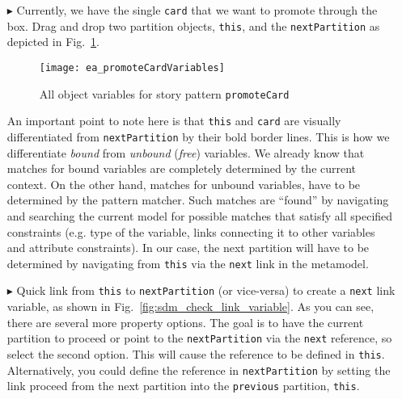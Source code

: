 \begin{itemize}
\vspace{0.5cm}

\item[$\blacktriangleright$] Currently, we have the single \texttt{card} that we want to promote through the box. Drag and drop two partition objects,
\texttt{this}, and the \texttt{nextPartition} as depicted in Fig.~\ref{fig:sdm_check_complete_sp}.

\begin{figure}[htbp]
\begin{center}
  \texttt{[image: ea\_promoteCardVariables]}
  \caption{All object variables for story pattern \texttt{promoteCard}}
  \label{fig:sdm_check_complete_sp}
\end{center}
\end{figure}

\vspace{0.5cm}

An important point to note here is that \texttt{this} and \texttt{card} are visually differentiated from \texttt{nextPartition} by
their bold border lines. This is how we differentiate \emph{bound} from \emph{unbound} (\emph{free}) variables. We already know that matches for bound
variables are completely determined by the current context. On the other hand, matches for unbound variables, have to be determined by the pattern matcher. Such
matches are ``found'' by navigating and searching the current model for possible matches that satisfy all specified constraints (e.g. type of the variable,
links connecting it to other variables and attribute constraints). In our case, the next partition will have to be determined by navigating from \texttt{this}
via the \texttt{next} link in the metamodel.

\vspace{0.5cm}

\item[$\blacktriangleright$] Quick link from \texttt{this} to \texttt{nextPartition} (or vice-versa) to create a \texttt{next} link variable, as shown in
Fig.~\ref{fig:sdm_check_link_variable}. As you can see, there are several more property options. The goal is to have the current partition to proceed or point
to the \texttt{nextPartition} via the \texttt{next} reference, so select the second option. This will cause the reference to be defined in \texttt{this}.
Alternatively, you could define the reference in \texttt{nextPartition} by setting the link proceed from the next partition into the \texttt{previous}
partition, \texttt{this}.


\end{itemize}

